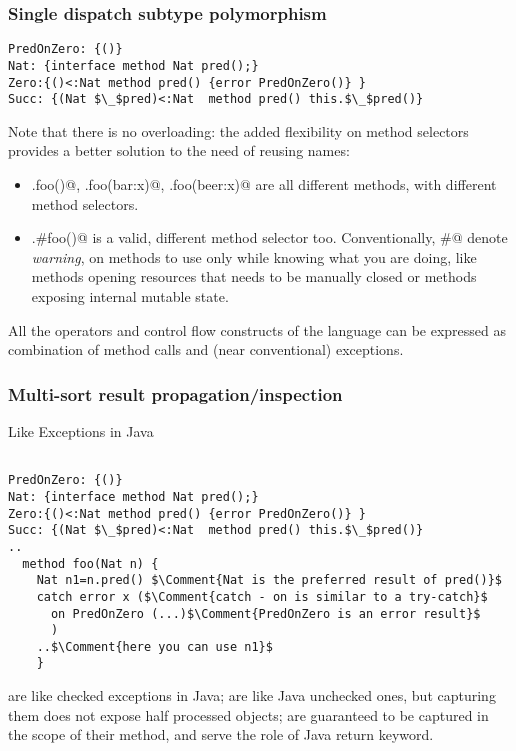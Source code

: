 \begin{frame}[fragile]
\frametitle{Single dispatch subtype polymorphism}
\begin{NiceCode}{59ex}{0.8}
\begin{lstlisting}
PredOnZero: {()}
Nat: {interface method Nat pred();}
Zero:{()<:Nat method pred() {error PredOnZero()} }
Succ: {(Nat $\_$pred)<:Nat  method pred() this.$\_$pred()}
\end{lstlisting}
\end{NiceCode}
Note that there is no overloading: the added flexibility on method selectors provides
a better solution to the need of reusing names:
\begin{itemize}
\item \Q@A.foo()@, \Q@A.foo(bar:x)@, \Q@A.foo(beer:x)@
are all different methods, with different method selectors.
\item \Q@A.#foo()@ is a valid, different method selector too.
Conventionally, \Q@#@  denote \emph{warning}, on methods to use only while knowing what you are doing, like methods opening resources that needs to be manually closed or methods exposing internal mutable state.
\end{itemize}
All the operators and control flow constructs of the language can be expressed as combination of 
method calls and (near conventional) exceptions.
\end{frame}

\begin{frame}[fragile]
\frametitle{Multi-sort result 
propagation/inspection}
Like Exceptions in Java

\begin{NiceCode}{59ex}{0.8}
\begin{lstlisting}

PredOnZero: {()}
Nat: {interface method Nat pred();}
Zero:{()<:Nat method pred() {error PredOnZero()} }
Succ: {(Nat $\_$pred)<:Nat  method pred() this.$\_$pred()}
..
  method foo(Nat n) {
    Nat n1=n.pred() $\Comment{Nat is the preferred result of pred()}$
    catch error x ($\Comment{catch - on is similar to a try-catch}$
      on PredOnZero (...)$\Comment{PredOnZero is an error result}$
      )
    ..$\Comment{here you can use n1}$
    }
\end{lstlisting}
\end{NiceCode}

{\small
\Q@exception@s are like checked exceptions in Java;
\Q@error@s are like Java unchecked ones, but capturing them does not expose half processed objects;
\Q@return@s are guaranteed to be captured in the scope of their method, and serve the role of Java return keyword.
}
\end{frame}

